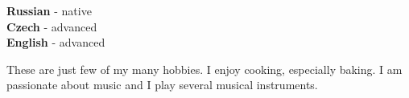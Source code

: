 \documentclass[9pt]{developercv} %
\begin{document}
\begin{minipage}[t]{0.3\textwidth}
    \vspace{-\baselineskip} %


    \textbf{Russian} - native\\
    \textbf{Czech} - advanced\\
    \textbf{English} - advanced
\end{minipage}
\hfill
\begin{minipage}[t]{0.7\textwidth}
    \vspace{-\baselineskip} %


    These are just few of my many hobbies.
    I enjoy cooking, especially baking.
    I am passionate about music and I play several musical instruments.

\end{minipage}
\hfill

\end{document}
